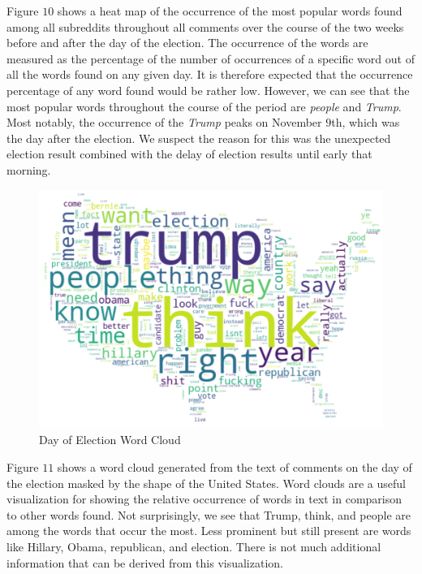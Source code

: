 \documentclass[letterpaper]{article}
\begin{document}
Figure $10$ shows a heat map of the occurrence of the most popular words found among all subreddits throughout all comments over the course of the two weeks before and after the day of the election. The occurrence of the words are measured as the percentage of the number of occurrences of a specific word out of all the words found on any given day. It is therefore expected that the occurrence percentage of any word found would be rather low. However, we can see that the most popular words throughout the course of the period are \textit{people} and \textit{Trump}. Most notably, the occurrence of the \textit{Trump} peaks on November $9$th, which was the day after the election. We suspect the reason for this was the unexpected election result combined with the delay of election results until early that morning.

\begin{figure}[!htb]
\begin{center}
\includegraphics[scale=0.5]{Images/day-of-comments-mask.png}
\caption{Day of Election Word Cloud}
\label{fig1}
\end{center}
\end{figure}

Figure $11$ shows a word cloud generated from the text of comments on the day of the election masked by the shape of the United States. Word clouds are a useful visualization for showing the relative occurrence of words in text in comparison to other words found. Not surprisingly, we see that Trump, think, and people are among the words that occur the most. Less prominent but still present are words like Hillary, Obama, republican, and election. There is not much additional information that can be derived from this visualization.
\end{document}
